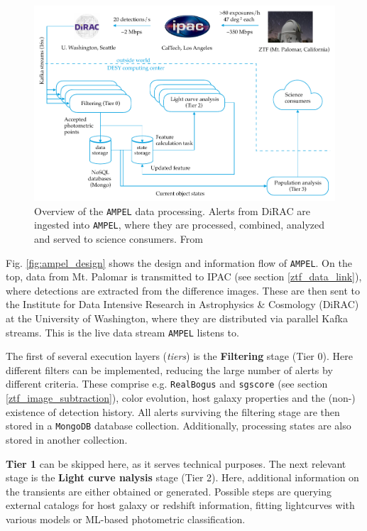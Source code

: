 \documentclass[
    a4paper, %
    fontsize=10pt, %
    twoside=true, %
    numbers=noenddot, %
    fontmethod=tex,
]{kaobook}
\begin{document}
\begin{figure}[h!]
    \includegraphics{fu/ampel_design.pdf}
    \caption[\texttt{AMPEL} overview]{Overview of the \texttt{AMPEL} data processing. Alerts from DiRAC are ingested into \texttt{AMPEL}, where they are processed, combined, analyzed and served to science consumers. From \cite{Nordin2019}}
\end{figure}

Fig. \ref{fig:ampel_design} shows the design and information flow of \texttt{AMPEL}. On the top, data from Mt. Palomar is transmitted to IPAC (see section \ref{ztf_data_link}), where detections are extracted from the difference images. These are then sent to the Institute for Data Intensive Research in Astrophysics \& Cosmology (DiRAC) at the University of Washington, where they are distributed via parallel Kafka streams. This is the live data stream \texttt{AMPEL} listens to.

The first of several execution layers (\textit{tiers}) is the \textbf{Filtering} stage (Tier 0). Here different filters can be implemented, reducing the large number of alerts by different criteria. These comprise e.g. \texttt{RealBogus} and \texttt{sgscore} (see section \ref{ztf_image_subtraction}), color evolution, host galaxy properties and the (non-) existence of detection history. All alerts surviving the filtering stage are then stored in a \texttt{MongoDB} database collection. Additionally, processing states are also stored in another collection.

\textbf{Tier 1} can be skipped here, as it serves technical purposes. The next relevant stage is the \textbf{Light curve nalysis} stage (Tier 2). Here, additional information on the transients are either obtained or generated. Possible steps are querying external catalogs for host galaxy or redshift information, fitting lightcurves with various models or ML-based photometric classification.
\end{document}
